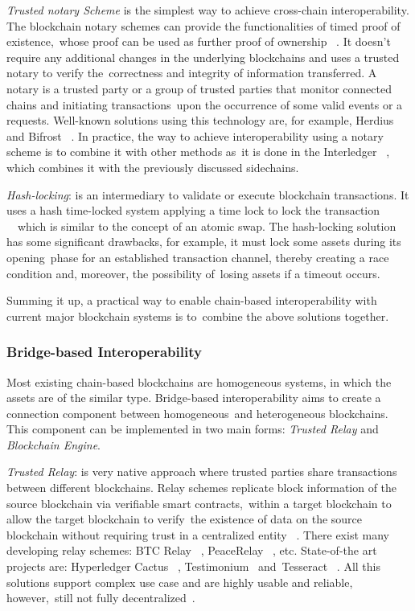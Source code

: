 \emph{Trusted notary Scheme} is the simplest way to achieve cross-chain interoperability.
The blockchain notary schemes can provide the functionalities of timed proof of existence,\
whose proof can be used as further proof of ownership ~\cite{DIFRANCESCOMAESA202099}.
It doesn't require any additional changes in the underlying blockchains and uses a trusted notary to verify the\
correctness and integrity of information transferred.
A notary is a trusted party or a group of trusted parties that monitor connected chains and initiating transactions\
upon the occurrence of some valid events or a requests.
Well-known solutions using this technology are, for example, Herdius ~\cite{Balazs2017} and Bifrost ~\cite{Scheid2019}.
In practice, the way to achieve interoperability using a notary scheme is to combine it with other methods as\
it is done in the Interledger ~\cite{Thomas2015}, which combines it with the previously discussed sidechains.

\emph{Hash-locking}: is an intermediary to validate or execute blockchain transactions.
It uses a hash time-locked system applying a time lock to lock the transaction ~\cite{Pillai2019}\
which is similar to the concept of an atomic swap.
The hash-locking solution has some significant drawbacks, for example, it must lock some assets during its opening\
phase for an established transaction channel, thereby creating a race condition and, moreover, the possibility of\
losing assets if a timeout occurs.

Summing it up, a practical way to enable chain-based interoperability with current major blockchain systems is to\
combine the above solutions together.

\subsubsection{Bridge-based Interoperability}
Most existing chain-based blockchains are homogeneous systems, in which the assets are of the similar type.
Bridge-based interoperability aims to create a connection component between homogeneous\
and heterogeneous blockchains.
This component can be implemented in two main forms: \emph{Trusted Relay} and \emph{Blockchain Engine}.

\emph{Trusted Relay}: is very native approach where trusted parties share transactions between different blockchains.
Relay schemes replicate block information of the source blockchain via verifiable smart contracts,\
within a target blockchain to allow the target blockchain to verify\
the existence of data on the source blockchain without requiring trust in a centralized entity ~\cite{buterin2016}.
There exist many developing relay schemes: BTC Relay ~\cite{Chow2016}, PeaceRelay ~\cite{Luu2019}, etc.
State-of-the art projects are: Hyperledger Cactus ~\cite{Hyperledger2020}, Testimonium~\cite{Frauenthaler2020} and\
Tesseract ~\cite{cryptoeprint:2017/1153}.
All this solutions support complex use case and are highly usable and reliable, however,\
still not fully decentralized~\cite{cryptoeprint:2021/537}.

